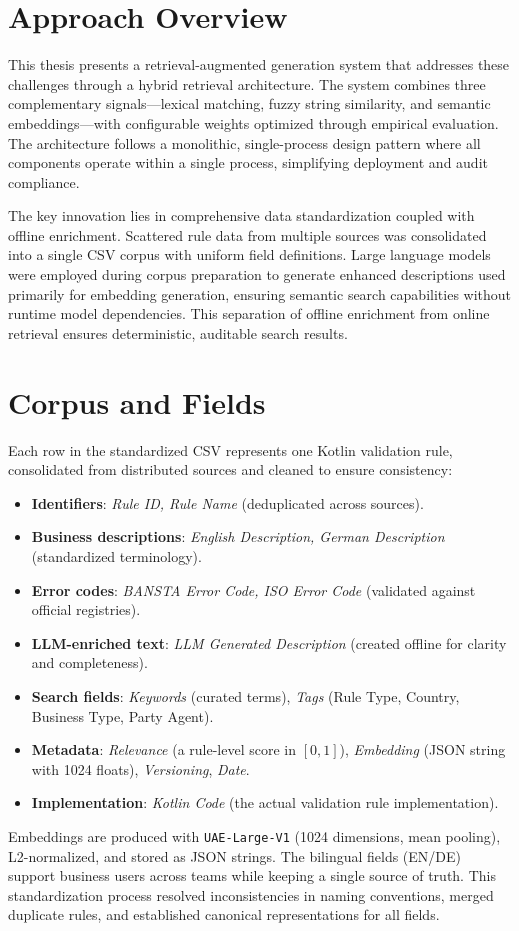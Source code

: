\section{Approach Overview}
This thesis presents a retrieval-augmented generation system that addresses these challenges through a hybrid retrieval architecture. The system combines three complementary signals—lexical matching, fuzzy string similarity, and semantic embeddings—with configurable weights optimized through empirical evaluation. The architecture follows a monolithic, single-process design pattern where all components operate within a single process, simplifying deployment and audit compliance.

The key innovation lies in comprehensive data standardization coupled with offline enrichment. Scattered rule data from multiple sources was consolidated into a single CSV corpus with uniform field definitions. Large language models were employed during corpus preparation to generate enhanced descriptions used primarily for embedding generation, ensuring semantic search capabilities without runtime model dependencies. This separation of offline enrichment from online retrieval ensures deterministic, auditable search results.

\section{Corpus and Fields}
Each row in the standardized CSV represents one Kotlin validation rule, consolidated from distributed sources and cleaned to ensure consistency:
\begin{itemize}[leftmargin=*,itemsep=2pt,topsep=2pt]
 \item \textbf{Identifiers}: \textit{Rule ID, Rule Name} (deduplicated across sources).
 \item \textbf{Business descriptions}: \textit{English Description, German Description} (standardized terminology).
 \item \textbf{Error codes}: \textit{BANSTA Error Code, ISO Error Code} (validated against official registries).
 \item \textbf{LLM-enriched text}: \textit{LLM Generated Description} (created offline for clarity and completeness).
 \item \textbf{Search fields}: \textit{Keywords} (curated terms), \textit{Tags} (Rule Type, Country, Business Type, Party Agent).
 \item \textbf{Metadata}: \textit{Relevance} (a rule-level score in $[0,1]$), \textit{Embedding} (JSON string with 1024 floats), \textit{Versioning}, \textit{Date}.
 \item \textbf{Implementation}: \textit{Kotlin Code} (the actual validation rule implementation).
\end{itemize}
Embeddings are produced with \texttt{UAE-Large-V1} (1024 dimensions, mean pooling), L2-normalized, and stored as JSON strings. The bilingual fields (EN/DE) support business users across teams while keeping a single source of truth. This standardization process resolved inconsistencies in naming conventions, merged duplicate rules, and established canonical representations for all fields.

